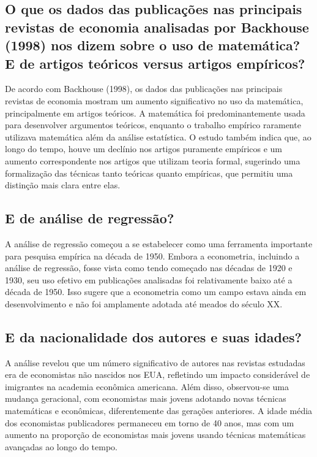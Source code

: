 \documentclass[a4paper,12pt]{article}[abntex2]
\begin{document}
\subsection{\textbf{O que os dados das publicações nas principais revistas de economia analisadas por Backhouse (1998) nos dizem sobre o uso de matemática? E de artigos teóricos versus artigos empíricos?}}
 De acordo com Backhouse (1998), os dados das publicações nas principais revistas de economia mostram um aumento significativo no uso da matemática, principalmente em artigos teóricos. A matemática foi predominantemente usada para desenvolver argumentos teóricos, enquanto o trabalho empírico raramente utilizava matemática além da análise estatística. O estudo também indica que, ao longo do tempo, houve um declínio nos artigos puramente empíricos e um aumento correspondente nos artigos que utilizam teoria formal, sugerindo uma formalização das técnicas tanto teóricas quanto empíricas, que permitiu uma distinção mais clara entre elas.

\subsection{\textbf{E de análise de regressão?}}
A análise de regressão começou a se estabelecer como uma ferramenta importante para pesquisa empírica na década de 1950. Embora a econometria, incluindo a análise de regressão, fosse vista como tendo começado nas décadas de 1920 e 1930, seu uso efetivo em publicações analisadas foi relativamente baixo até a década de 1950. Isso sugere que a econometria como um campo estava ainda em desenvolvimento e não foi amplamente adotada até meados do século XX.

\subsection{\textbf{E da nacionalidade dos autores e suas idades?}}
A análise revelou que um número significativo de autores nas revistas estudadas era de economistas não nascidos nos EUA, refletindo um impacto considerável de imigrantes na academia econômica americana. Além disso, observou-se uma mudança geracional, com economistas mais jovens adotando novas técnicas matemáticas e econômicas, diferentemente das gerações anteriores. A idade média dos economistas publicadores permaneceu em torno de 40 anos, mas com um aumento na proporção de economistas mais jovens usando técnicas matemáticas avançadas ao longo do tempo.
\end{document}
